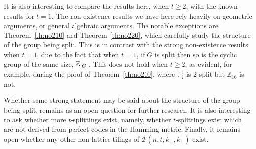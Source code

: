 \documentclass[sort&compress]{elsarticle}
\DeclarePairedDelimiter\abs{\lvert}{\rvert}
\renewcommand{\geq}{\geqslant}
\newcommand{\F}{\mathbb{F}}
\newcommand{\Z}{\mathbb{Z}}
\newcommand{\kp}{k_+}
\newcommand{\km}{k_-}
\newcommand{\BALL}{{\mathcal B}(n,t,\kp,\km)}
\begin{document}
It is also interesting to compare the results here, when $t\geq 2$,
with the known results for $t=1$. The non-existence results we have
here rely heavily on geometric arguments, or general algebraic
arguments. The notable exceptions are Theorem~\ref{th:no210} and
Theorem~\ref{th:no220}, which carefully study the structure of the
group being split. This is in contrast with the strong non-existence
results when $t=1$, due to the fact that when $t=1$, if $G$ is split
then so is the cyclic group of the same size, $\Z_{\abs{G}}$. This
does not hold when $t\geq 2$, as evident, for example, during the
proof of Theorem~\ref{th:no210}, where $\F_2^4$ is $2$-split but
$\Z_{16}$ is not.

Whether some strong statement may be said about the structure of the
group being split, remains as an open question for further
research. It is also interesting to ask whether more $t$-splittings
exist, namely, whether $t$-splittings exist which are not derived from
perfect codes in the Hamming metric. Finally, it remains open whether
any other non-lattice tilings of $\BALL$ exist. 
  
  
  
\end{document}
